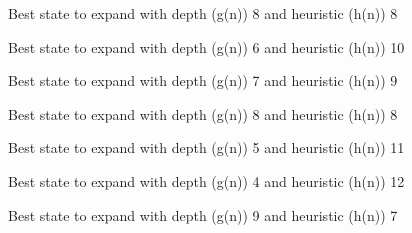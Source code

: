 \documentclass{article}
\begin{document}
{\noindent Best state to expand with depth (g(n)) 8 and heuristic (h(n)) 8\newline}
{}\newline

{\noindent Best state to expand with depth (g(n)) 6 and heuristic (h(n)) 10\newline}
{}\newline

{\noindent Best state to expand with depth (g(n)) 7 and heuristic (h(n)) 9\newline}
{}\newline

{\noindent Best state to expand with depth (g(n)) 8 and heuristic (h(n)) 8\newline}
{}\newline

{\noindent Best state to expand with depth (g(n)) 5 and heuristic (h(n)) 11\newline}
{}\newline

{\noindent Best state to expand with depth (g(n)) 4 and heuristic (h(n)) 12\newline}
{}\newline

{\noindent Best state to expand with depth (g(n)) 9 and heuristic (h(n)) 7\newline}
{}\newline
\end{document}

